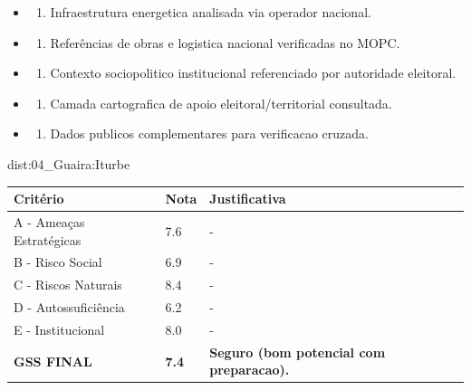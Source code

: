{\begin{itemize}
\item
  \begin{enumerate}
  \def\labelenumi{\arabic{enumi})}
  \setcounter{enumi}{7}
  \tightlist
  \item
    Infraestrutura energetica analisada via operador nacional.
  \end{enumerate}
\item
  \begin{enumerate}
  \def\labelenumi{\arabic{enumi})}
  \setcounter{enumi}{8}
  \tightlist
  \item
    Referências de obras e logistica nacional verificadas no MOPC.
  \end{enumerate}
\item
  \begin{enumerate}
  \def\labelenumi{\arabic{enumi})}
  \setcounter{enumi}{9}
  \tightlist
  \item
    Contexto sociopolitico institucional referenciado por autoridade
    eleitoral.
  \end{enumerate}
\item
  \begin{enumerate}
  \def\labelenumi{\arabic{enumi})}
  \setcounter{enumi}{10}
  \tightlist
  \item
    Camada cartografica de apoio eleitoral/\allowbreak territorial consultada.
  \end{enumerate}
\item
  \begin{enumerate}
  \def\labelenumi{\arabic{enumi})}
  \setcounter{enumi}{11}
  \tightlist
  \item
    Dados publicos complementares para verificacao cruzada.
  \end{enumerate}
\end{itemize}}{dist:04_Guaira:Iturbe}
\begin{table}[ht!]
\small \begin{tabular}{p{3.0cm}p{0.8cm}p{6.0cm}} \toprule
\textbf{Critério} & \textbf{Nota} & \textbf{Justificativa} \\ \midrule
A - Ameaças Estratégicas & 7.6 & - \\
B - Risco Social & 6.9 & - \\
C - Riscos Naturais & 8.4 & - \\
D - Autossuficiência & 6.2 & - \\
E - Institucional & 8.0 & - \\
\midrule \textbf{GSS FINAL} & \textbf{7.4} & \textbf{Seguro (bom potencial com preparacao).} \\ \bottomrule \end{tabular}
\end{table}
